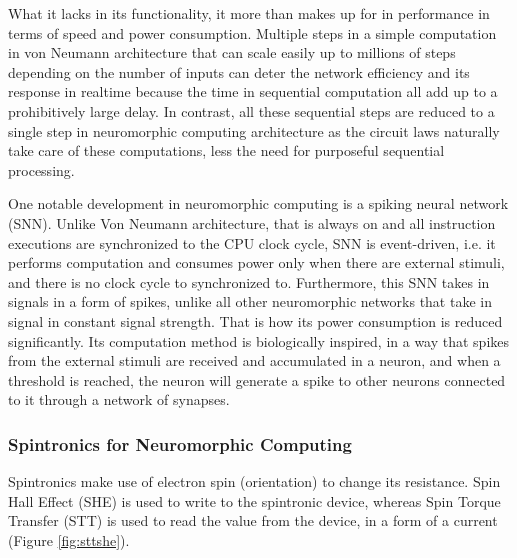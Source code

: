 What it lacks in its functionality, it more than makes up for in performance in terms of speed and power consumption. Multiple steps in a simple computation in von Neumann architecture that can scale easily up to millions of steps depending on the number of inputs can deter the network efficiency and its response in realtime because the time in sequential computation all add up to a prohibitively large delay. In contrast, all these sequential steps are reduced to a single step in neuromorphic computing architecture as the circuit laws naturally take care of these computations, less the need for purposeful sequential processing.

One notable development in neuromorphic computing is a spiking neural network (SNN). Unlike Von Neumann architecture, that is always on and all instruction executions are synchronized to the CPU clock cycle, SNN is event-driven, i.e. it performs computation and consumes power only when there are external stimuli, and there is no clock cycle to synchronized to. Furthermore, this SNN takes in signals in a form of spikes, unlike all other neuromorphic networks that take in signal in constant signal strength. That is how its power consumption is reduced significantly. Its computation method is biologically inspired, in a way that spikes from the external stimuli are received and accumulated in a neuron, and when a threshold is reached, the neuron will generate a spike to other neurons connected to it through a network of synapses.
\subsubsection{Spintronics for Neuromorphic Computing}
Spintronics make use of electron spin (orientation) to change its resistance. Spin Hall Effect (SHE) is used to write to the spintronic device, whereas Spin Torque Transfer (STT) is used to read the value from the device, in a form of a current (Figure \ref{fig:sttshe}).


